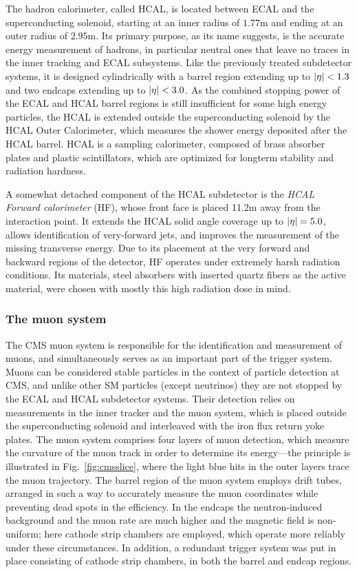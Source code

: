 The hadron calorimeter, called HCAL, is located between ECAL and the superconducting solenoid, starting at an inner radius of $1.77$\unit{m} and ending at an outer radius of $2.95$\unit{m}.
% 
Its primary purpose, as its name suggests, is the accurate energy measurement of hadrons, in particular neutral ones that leave no traces in the inner tracking and ECAL subsystems.
% 
Like the previously treated subdetector systems, it is designed cylindrically with a barrel region extending up to $\left| \eta \right | < 1.3$ and two endcaps extending up to $\left| \eta \right | < 3.0$.
% 
As the combined stopping power of the ECAL and HCAL barrel regions is still insufficient for some high energy particles, the HCAL is extended outside the superconducting solenoid by the HCAL Outer Calorimeter, which measures the shower energy deposited after the HCAL barrel.
% 
HCAL is a sampling calorimeter, composed of brass absorber plates and plastic scintillators, which are optimized for longterm stability and radiation hardness.


A somewhat detached component of the HCAL subdetector is the \textit{HCAL Forward calorimeter} (HF), whose front face is placed 11.2\unit{m} away from the interaction point.
% 
It extends the HCAL solid angle coverage up to $\left| \eta \right | = 5.0$, allows identification of very-forward jets, and improves the measurement of the missing transverse energy.
% 
Due to its placement at the very forward and backward regions of the detector, HF operates under extremely harsh radiation conditions.
% 
Its materials, steel absorbers with inserted quartz fibers as the active material, were chosen with mostly this high radiation dose in mind.



\subsubsection{The muon system}

The CMS muon system is responsible for the identification and measurement of muons, and simultaneously serves as an important part of the trigger system.
% 
Muons can be considered stable particles in the context of particle detection at CMS, and unlike other SM particles (except neutrinos) they are not stopped by the ECAL and HCAL subdetector systems.
% 
Their detection relies on measurements in the inner tracker and the muon system, which is placed outside the superconducting solenoid and interleaved with the iron flux return yoke plates.
% 
The muon system comprises four layers of muon detection, which measure the curvature of the muon track in order to determine its energy---the principle is illustrated in Fig.~\ref{fig:cmsslice}, where the light blue hits in the outer layers trace the muon trajectory.
% 
The barrel region of the muon system employs drift tubes, arranged in such a way to accurately measure the muon coordinates while preventing dead spots in the efficiency.
% 
In the endcaps the neutron-induced background and the muon rate are much higher and the magnetic field is non-uniform; here cathode strip chambers are employed, which operate more reliably under these circumstances.
% 
In addition, a redundant trigger system was put in place consisting of cathode strip chambers, in both the barrel and endcap regions.


